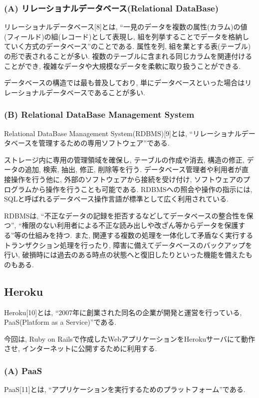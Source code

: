 \subsubsection{(A) リレーショナルデータベース(Relational DataBase)}
リレーショナルデータベース[8]とは, “一見のデータを複数の属性(カラム)の値(フィールド)の組(レコード)として表現し, 組を列挙することでデータを格納していく方式のデータベース”のことである.
属性を列, 組を業とする表(テーブル)の形で表されることが多い.
複数のテーブルに含まれる同じカラムを関連付けることができ, 複雑なデータや大規模なデータを柔軟に取り扱うことができる.

データベースの構造では最も普及しており, 単にデータベースといった場合はリレーショナルデータベースであることが多い.

\subsubsection{(B) Relational DataBase Management System}
Relational DataBase Management System(RDBMS)[9]とは, “リレーショナルデータベースを管理するための専用ソフトウェア”である.

ストレージ内に専用の管理領域を確保し, テーブルの作成や消去, 構造の修正, データの追加, 検索, 抽出, 修正, 削除等を行う.
データベース管理者や利用者が直接操作を行う他に, 外部のソフトウェアから接続を受け付け, ソフトウェアのプログラムから操作を行うことも可能である.
RDBMSへの照会や操作の指示には, SQLと呼ばれるデータベース操作言語が標準として広く利用されている.

RDBMSは, “不正なデータの記録を拒否するなどしてデータベースの整合性を保つ”, “権限のない利用者による不正な読み出しや改ざん等からデータを保護する”等の仕組みを持つ.
また, 関連する複数の処理を一体化して矛盾なく実行するトランザクション処理を行ったり, 障害に備えてデータベースのバックアップを行い, 破損時には過去のある時点の状態へと復旧したりといった機能を備えたものもある.

\subsection{Heroku}
Heroku[10]とは, “2007年に創業された同名の企業が開発と運営を行っている, PaaS(Platform as a Service)”である.

今回は, Ruby on Railsで作成したWebアプリケーションをHerokuサーバにて動作させ, インターネットに公開するために利用する.

\subsubsection{(A) PaaS}
PaaS[11]とは, “アプリケーションを実行するためのプラットフォーム”である.

